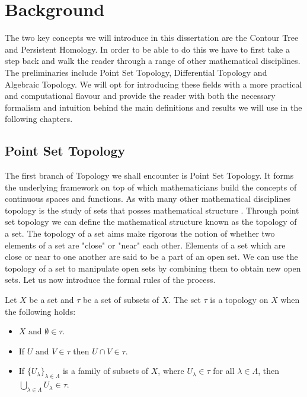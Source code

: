 \chapter{Background}
\label{chapter2}

The two key concepts we will introduce in this dissertation are the Contour Tree and Persistent Homology. In order to be able to do this we have to first take a step back and walk the reader through a range of other mathematical disciplines. The preliminaries include Point Set Topology, Differential Topology and Algebraic Topology. We will opt for introducing these fields with a more practical and computational flavour and provide the reader with both the necessary formalism and intuition behind the main definitions and results we will use in the following chapters.

\section{Point Set Topology}

The first branch of Topology we shall encounter is Point Set Topology. It forms the underlying framework on top of which mathematicians build the concepts of continuous spaces and functions. As with many other mathematical disciplines topology is the study of sets that posses mathematical structure \cite{intro-topo}. Through point set topology we can define the mathematical structure known as the topology of a set. The topology of a set aims make rigorous the notion of whether two elements of a set are "close" or "near" each other. Elements of a set which are close or near to one another are said to be a part of an open set. We can use the topology of a set to manipulate open sets by combining them to obtain new open sets. Let us now introduce the formal rules of the process.

\begin{defn} Let $X$ be a set and $\tau$ be a set of subsets of $X$. The set $\tau$ is a topology on $X$ when the following holds:  \end{defn}

\begin{itemize}
    \item $X \text{ and } \emptyset \in \tau$.
    \item If $U \text{ and } V \in \tau$ then $U \cap V \in \tau$.
    \item If $\{U_\lambda\}_{\lambda \in \Lambda}$ is a family of subsets of $X$, where $U_\lambda \in \tau$ for all $\lambda \in \Lambda$, then 
        $\bigcup_{\lambda \in \Lambda}{U_\lambda} \in \tau$.
\end{itemize}

